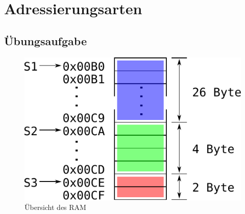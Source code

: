 \newpage
\section{Adressierungsarten}

\subsection{Übungsaufgabe}




\begin{figure}[h!]
	\centering
	\includegraphics[scale=1]{../fig/addr.pdf}
	\caption{Übersicht des RAM}
\end{figure}
